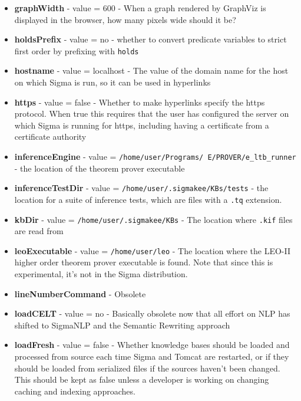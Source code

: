\documentclass{book}
\begin{document}
\begin{itemize}
\item \textbf{graphWidth} - value = 600 - When a graph rendered by GraphViz is
displayed in the browser, how many pixels wide should it be?

\item \textbf{holdsPrefix} - value = no - whether to convert predicate variables
to strict first order by prefixing with \texttt{holds}

\item \textbf{hostname} - value = localhost - The value of the domain name for
the host on which Sigma is run, so it can be used in hyperlinks

\item \textbf{https} - value = false - Whether to make hyperlinks specify the
https protocol.  When true this requires that the user has configured the server
on which Sigma is running for https, including having a certificate from a
certificate authority

\item \begin{sloppypar}\textbf{inferenceEngine} - value =
\texttt{/home/user/Programs/ E/PROVER/e\_ltb\_runner} - the location of the theorem
prover executable\end{sloppypar}

\item \textbf{inferenceTestDir} - value =
\texttt{/home/user/.sigmakee/KBs/tests} - the location for a suite of inference
tests, which are files with a \texttt{.tq} extension.

\item \textbf{kbDir} - value = \texttt{/home/user/.sigmakee/KBs} - The location
where \texttt{.kif} files are read from

\item \textbf{leoExecutable}  - value = \texttt{/home/user/leo} - The location
where the LEO-II higher order theorem prover executable is found.  Note that
since this is experimental, it's not in the Sigma distribution.

\item \textbf{lineNumberCommand} - Obsolete

\item \textbf{loadCELT} - value = no - Basically obsolete now that all effort
on NLP has shifted to SigmaNLP and the Semantic Rewriting approach

\item \textbf{loadFresh} - value = false - Whether knowledge bases should be
loaded and processed from source each time Sigma and Tomcat are restarted, or if
they should be loaded from serialized files if the sources haven't been changed.
This should be kept as false unless a developer is working on changing caching
and indexing approaches.


\end{itemize}
\end{document}
